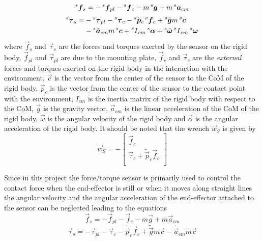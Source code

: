 \begin{equation}
  \prescript{s}{}{ \vec{f}}_{s} = -\prescript{s}{}{ \vec{f}}_{pl} -\prescript{s}{}{ \vec{f}}_{c} -m \prescript{s}{}{ \vec{g}}
  + m \prescript{s}{}{ \vec{a}}_{cm}
\end{equation}
\begin{equation}\label{eq:ne_torque_1}
  \begin{split}
  \prescript{s}{}{ \vec{\tau}}_{s} =& -\prescript{s}{}{ \vec{\tau}}_{pl} -\prescript{s}{}{ \vec{\tau}}_{c}
  - \prescript{s}{}{ \tilde{\vec{p}}}_{c} \prescript{s}{}{ \vec{f}}_{c}
  + \prescript{s}{}{ \tilde{\vec{g}}} m\prescript{s}{}{\vec{c}} \\
  & - \prescript{s}{}{ \tilde{\vec{a}}}_{cm} m \prescript{s}{}{ \vec{c}}
  + \prescript{s}{}{ I}_{cm} \prescript{s}{}{\vec{\alpha}}
  + \prescript{s}{}{ \tilde{\vec{\omega}}} \prescript{s}{}{ I}_{cm} \prescript{s}{}{ \vec{\omega}}\\
  \end{split}
\end{equation}
where
$\vec{f}_{s}$ and $\vec{\tau}_{s}$ are the forces and torques exerted by the sensor on the rigid body,
$\vec{f}_{pl}$ and $\vec{\tau}_{pl}$ are due to the mounting plate,
$\vec{f}_{c}$ and $\vec{\tau}_{c}$ are the \emph{external} forces and torques exerted on the rigid body in the interaction
with the environment,
$\vec{c}$ is the vector from the center of the sensor to the CoM of the rigid body,
$\vec{p}_{c}$ is the vector from the center of the sensor to the contact point with the environment,
$I_{cm}$ is the inertia matrix of the rigid body with respect to the CoM,
$\vec{g}$ is the gravity vector, $\vec{a}_{cm}$ is the linear acceleration of the CoM of the rigid body,
$\vec{\omega}$ is the angular velocity of the rigid body and
$\vec{\alpha}$ is the angular acceleration of the rigid body.
It should be noted that the wrench $\vec{w}_{S}$  is given by
\[
\vec{w}_{S} = -
\begin{bmatrix}
  \vec{f}_{c}\\
  \vec{\tau}_{c} +\tilde{\vec{p}}_{c} \vec{f}_{c}\\
\end{bmatrix}
\]
\par
Since in this project the force/torque sensor is primarily used to control the contact force when the end-effector
is still or when it moves along straight lines the angular velocity and the angular acceleration of the end-effector
attached to the sensor can be neglected leading to the equations
\begin{equation}
  \label{eq:ne_force_2}
   \vec{f}_{s} = - \vec{f}_{pl} - \vec{f}_{c} -m  \vec{g} + m  \vec{a}_{cm}
\end{equation}
\begin{equation}
  \label{eq:ne_torque_2}
   \vec{\tau}_{s} = - \vec{\tau}_{pl} - \vec{\tau}_{c} - \tilde{\vec{p}}_{c}  \vec{f}_{c}
   + \tilde{\vec{g}} m\vec{c} -  \tilde{\vec{a}}_{cm} m  \vec{c}
\end{equation}

